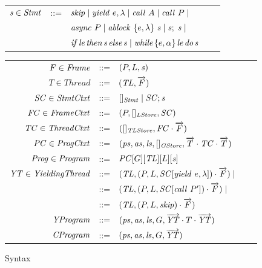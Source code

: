\begin{figure}
\setlength{\tabcolsep}{3pt}
\scriptsize{
\begin{tabular}{rclcl}
$\mathit{s} \in \mathit{Stmt}$ &::= & $\mathit{skip} \mid \mathit{yield}\ e,\lambda \mid \mathit{call}\ A \mid \mathit{call}\ P \mid$ \\
                  & & $\mathit{async}\ P \mid \mathit{ablock}\ {\{e,\lambda\}}\ {\mathit{s}} \mid \mathit{s};\;\mathit{s} \mid$\\
                  & & $\mathit{if}\hspace{0.5mm}{\mathit{le}}\hspace{0.5mm}\mathit{then}\hspace{0.5mm}{\mathit{s}}\hspace{0.5mm}\mathit{else}\hspace{0.5mm}{\mathit{s}} \mid \mathit{while}\hspace{0.5mm}\{e,\alpha\}\hspace{0.5mm}{\mathit{le}}\hspace{0.5mm}\mathit{do}\hspace{0.5mm}{\mathit{s}}$ \vspace{6pt} \\
\end{tabular}
\begin{tabular}{rclcl}
$F \in \mathit{Frame}$ &::= & $(P, L, \mathit{s})$ \\
$T \in \mathit{Thread}$ &::= &$(\mathit{TL}, \overrightarrow{F})$ \\
$\mathit{SC} \in \mathit{StmtCtxt}$ &::= &$[]_{\mathit{Stmt}} \mid \mathit{SC};\mathit{s}$ \\
$\mathit{FC} \in \mathit{FrameCtxt}$ &::= & $(P, []_{\mathit{LStore}}, \mathit{SC})$ \\
$\mathit{TC} \in \mathit{ThreadCtxt}$ &::= &$([]_{\mathit{TLStore}}, \mathit{FC}\cdot\overrightarrow{F})$ \\
$\mathit{PC} \in \mathit{ProgCtxt}$ &::= & $(\mathit{ps}, \mathit{as}, \mathit{ls}, []_{\mathit{GStore}}, \overrightarrow{T} \cdot \mathit{TC} \cdot \overrightarrow{T})$ \\
$\mathit{Prog} \in \mathit{Program}$ &::= & $\mathit{PC}[G][\mathit{TL}][L][\mathit{s}]$ \vspace{6pt} \\
$\mathit{YT} \in \mathit{YieldingThread}$ &::= &$(\mathit{TL}, (P,L,\mathit{SC}[\mathit{yield}\ e,\lambda])\cdot\overrightarrow{F}) \mid$ \\
                                              &::= &$(\mathit{TL}, (P,L,\mathit{SC}[\mathit{call}\ P'])\cdot\overrightarrow{F}) \mid$ \\
                                              &::= &$(\mathit{TL}, (P,L,\mathit{skip})\cdot\overrightarrow{F})$ \\
$\mathit{YProgram}$ &::= & $(\mathit{ps}, \mathit{as}, \mathit{ls}, G, \overrightarrow{\mathit{YT}} \cdot T \cdot \overrightarrow{\mathit{YT}})$ \\
$\mathit{CProgram}$ &::= & $(\mathit{ps}, \mathit{as}, \mathit{ls}, G, \overrightarrow{\mathit{YT}})$
\end{tabular}
}
\caption{Syntax}
\label{fig:syntax}
\end{figure}

